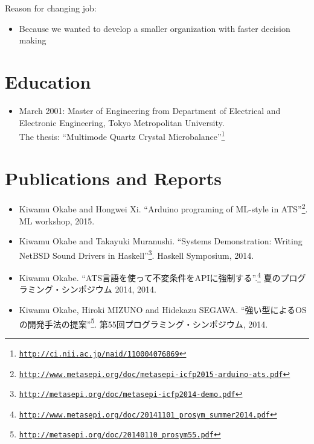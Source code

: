 \documentclass[letterpaper]{article}
\begin{document}
\noindent Reason for changing job:

\begin{itemize}
  \item Because we wanted to develop a smaller organization with faster decision making
\end{itemize}

\section*{Education}

\begin{itemize}
  \item March 2001: Master of Engineering from Department of Electrical and Electronic Engineering, Tokyo Metropolitan University. \\
    The thesis: ``Multimode Quartz Crystal Microbalance''\footnote{\href{http://ci.nii.ac.jp/naid/110004076869}{\tt http://ci.nii.ac.jp/naid/110004076869}}
\end{itemize}

\section*{Publications and Reports}

\begin{itemize}
  \item Kiwamu Okabe and Hongwei Xi. ``Arduino programing of ML-style in ATS''\footnote{\href{http://www.metasepi.org/doc/metasepi-icfp2015-arduino-ats.pdf}{\tt http://www.metasepi.org/doc/metasepi-icfp2015-arduino-ats.pdf}}. ML workshop, 2015.
  \item Kiwamu Okabe and Takayuki Muranushi. ``Systems Demonstration: Writing NetBSD Sound Drivers in Haskell''\footnote{\href{http://metasepi.org/doc/metasepi-icfp2014-demo.pdf}{\tt http://metasepi.org/doc/metasepi-icfp2014-demo.pdf}}. Haskell Symposium, 2014.
  \item Kiwamu Okabe. ``ATS言語を使って不変条件をAPIに強制する''.\footnote{\href{http://www.metasepi.org/doc/20141101\_prosym\_summer2014.pdf}{\tt http://www.metasepi.org/doc/20141101\_prosym\_summer2014.pdf}} 夏のプログラミング・シンポジウム 2014, 2014.
  \item Kiwamu Okabe, Hiroki MIZUNO and Hidekazu SEGAWA. ``強い型によるOSの開発手法の提案''\footnote{\href{http://metasepi.org/doc/20140110\_prosym55.pdf}{\tt http://metasepi.org/doc/20140110\_prosym55.pdf}}. 第55回プログラミング・シンポジウム, 2014.
\end{itemize}
\end{document}
